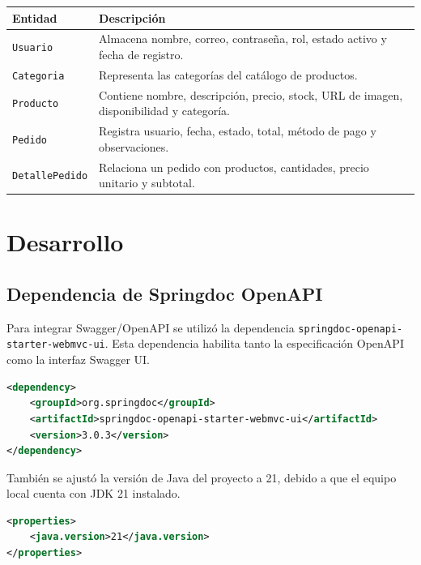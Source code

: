 \documentclass[10pt,a4paper]{article}
\newcommand{\cod}[1]{\texttt{\scriptsize #1}}
\begin{document}
\begin{longtable}{|>{\raggedright\arraybackslash}p{}|
                  >{\raggedright\arraybackslash}p{}|}
\hline
\rowcolor{cyan!20}
\textbf{Entidad} & \textbf{Descripción}\\
\hline
\texttt{Usuario} & Almacena nombre, correo, contraseña, rol, estado activo y fecha de registro.\\
\hline
\texttt{Categoria} & Representa las categorías del catálogo de productos.\\
\hline
\texttt{Producto} & Contiene nombre, descripción, precio, stock, URL de imagen, disponibilidad y categoría.\\
\hline
\texttt{Pedido} & Registra usuario, fecha, estado, total, método de pago y observaciones.\\
\hline
\texttt{DetallePedido} & Relaciona un pedido con productos, cantidades, precio unitario y subtotal.\\
\hline
\end{longtable}

\section{Desarrollo}

\subsection{Dependencia de Springdoc OpenAPI}

Para integrar Swagger/OpenAPI se utilizó la dependencia \cod{springdoc-openapi-starter-webmvc-ui}. Esta dependencia habilita tanto la especificación OpenAPI como la interfaz Swagger UI.

\begin{lstlisting}[language=XML,caption={Dependencia de Springdoc OpenAPI en pom.xml.}]
<dependency>
    <groupId>org.springdoc</groupId>
    <artifactId>springdoc-openapi-starter-webmvc-ui</artifactId>
    <version>3.0.3</version>
</dependency>
\end{lstlisting}

También se ajustó la versión de Java del proyecto a 21, debido a que el equipo local cuenta con JDK 21 instalado.

\begin{lstlisting}[language=XML,caption={Configuración de Java en pom.xml.}]
<properties>
    <java.version>21</java.version>
</properties>
\end{lstlisting}
\end{document}
